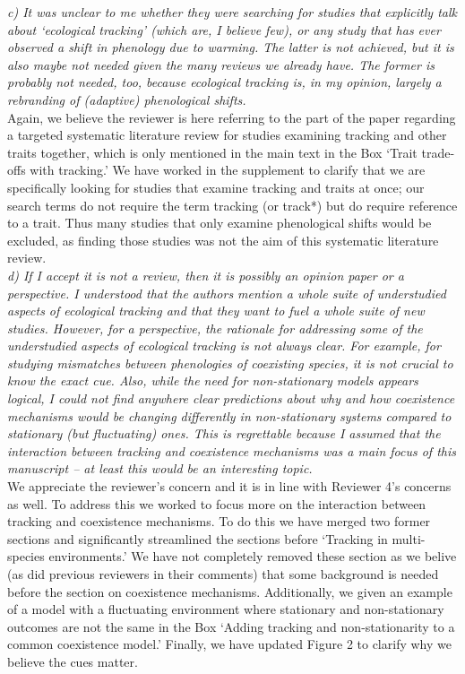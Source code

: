 \documentclass[11pt]{article}
\begin{document}
\emph{c) It was unclear to me whether they were searching for studies that explicitly talk about
‘ecological tracking’ (which are, I believe few), or any study that has ever observed a shift
in phenology due to warming. The latter is not achieved, but it is also maybe not needed
given the many reviews we already have. The former is probably not needed, too, because
ecological tracking is, in my opinion, largely a rebranding of (adaptive) phenological
shifts.}\\

Again, we believe the reviewer is here referring to the part of the paper regarding a targeted systematic literature review for studies examining tracking and other traits together, which is only mentioned in the main text in the Box `Trait trade-offs with tracking.' We have worked in the supplement to clarify that we are specifically looking for studies that examine tracking and traits at once; our search terms do not require the term tracking (or track*) but do require reference to a trait. Thus many studies that only examine phenological shifts would be excluded, as finding those studies was not the aim of this systematic literature review. \\ 

\emph{d) If I accept it is not a review, then it is possibly an opinion paper or a perspective. I
understood that the authors mention a whole suite of understudied aspects of ecological
tracking and that they want to fuel a whole suite of new studies. However, for a perspective,
the rationale for addressing some of the understudied aspects of ecological tracking is not
always clear. For example, for studying mismatches between phenologies of coexisting species,
it is not crucial to know the exact cue. Also, while the need for non-stationary models
appears logical, I could not find anywhere clear predictions about why and how coexistence
mechanisms would be changing differently in non-stationary systems compared to stationary
(but fluctuating) ones. This is regrettable because I assumed that the interaction between
tracking and coexistence mechanisms was a main focus of this manuscript – at least this would
be an interesting topic.}\\

We appreciate the reviewer's concern and it is in line with Reviewer 4's concerns as well. To address this we worked to focus more on the interaction between tracking and coexistence mechanisms. To do this we have merged two former sections and significantly streamlined the sections before `Tracking in multi-species environments.' We have not completely removed these section as we belive (as did previous reviewers in their comments) that some background is needed before the section on coexistence mechanisms. Additionally, we given an example of a model with a fluctuating environment where stationary and non-stationary outcomes are not the same in the Box `Adding tracking and non-stationarity to a common coexistence model.' Finally, we have updated Figure 2 to clarify why we believe the cues matter. \\
\end{document}
